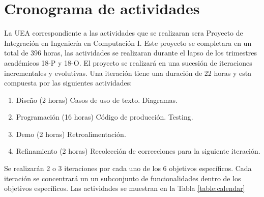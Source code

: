 \section{Cronograma de actividades}

La UEA correspondiente a las actividades que se realizaran sera Proyecto de Integración en Ingeniería en Computación I. Este proyecto se completara en un total de 396 horas, las actividades se realizaran durante el lapso de los trimestres académicos 18-P y 18-O. El proyecto se realizará en una sucesión de iteraciones incrementales y evolutivas. Una iteración tiene una duración de 22 horas y esta compuesta por las siguientes actividades: 
\begin{enumerate}
	\item Diseño (2 horas)
	\subitem Casos de uso de texto.
	\subitem Diagramas.
	\item Programación (16 horas)
	\subitem Código de producción.
	\subitem Testing.
	\item Demo (2 horas)
	\subitem Retroalimentación.
	\item Refinamiento (2 horas)
	\subitem Recolección de correcciones para la siguiente iteración.
\end{enumerate}

Se realizarán 2 o 3 iteraciones por cada uno de los 6 objetivos específicos. Cada iteración se concentrará un un subconjunto de funcionalidades dentro de los objetivos específicos.
  Las actividades se muestran en la Tabla \ref{table:calendar}

\newcommand\rownumber{\stepcounter{iteracion}\arabic{iteracion}}

